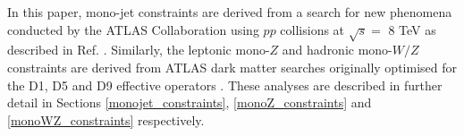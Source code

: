 In this paper, mono-jet constraints are derived from a search for new phenomena conducted by the ATLAS Collaboration using $pp$ collisions at $\sqrt{s}=$ 8 TeV as described in Ref. \cite{Aad:2015zva}. Similarly, the leptonic mono-$Z$ and hadronic mono-$W/Z$ constraints are derived from ATLAS dark matter searches originally optimised for the D1, D5 and D9 effective operators \cite{Aad:2014monoZlep, ATLASmonoWZ}. These analyses are described in further detail in Sections \ref{monojet_constraints}, \ref{monoZ_constraints} and \ref{monoWZ_constraints} respectively.


